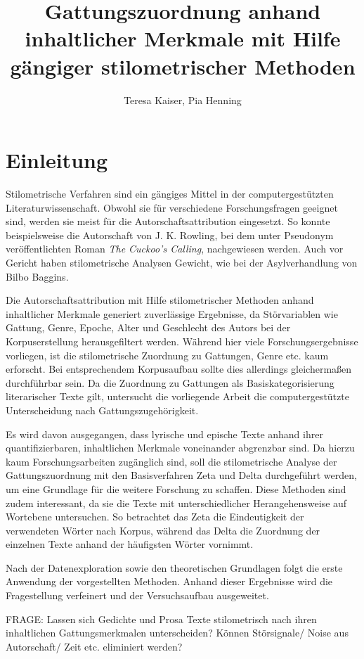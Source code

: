 \documentclass[a4paper,10p]{article}
\title{Gattungszuordnung anhand inhaltlicher Merkmale mit Hilfe gängiger stilometrischer Methoden}
\author{Teresa Kaiser, Pia Henning}
\begin{document}
\maketitle
\tableofcontents
\newpage
\listoffigures
\newpage
\section{Einleitung}
Stilometrische Verfahren sind ein gängiges Mittel in der computergestützten Literaturwissenschaft. Obwohl sie für verschiedene Forschungsfragen geeignet sind, werden sie meist für die Autorschaftsattribution eingesetzt. So konnte beispielsweise die Autorschaft von J. K. Rowling, bei dem unter Pseudonym veröffentlichten Roman \emph{The Cuckoo's Calling}, nachgewiesen werden. Auch vor Gericht haben stilometrische Analysen Gewicht, wie bei der Asylverhandlung von \glqq Bilbo Baggins\grqq \citep{Juola2015}.

Die Autorschaftsattribution mit Hilfe stilometrischer Methoden anhand inhaltlicher Merkmale generiert zuverlässige Ergebnisse, da Störvariablen wie Gattung, Genre, Epoche, Alter und Geschlecht des Autors bei der Korpuserstellung herausgefiltert werden. Während hier viele Forschungsergebnisse vorliegen, ist die stilometrische Zuordnung zu Gattungen, Genre etc. kaum erforscht. Bei ent\-sprech\-en\-dem Korpusaufbau sollte dies allerdings gleichermaßen durchführbar sein. Da die Zuordnung zu Gattungen als Basiskategorisierung literarischer Texte gilt, untersucht die vorliegende Arbeit die computergestützte Unterscheidung nach Gattungszugehörigkeit. 

Es wird davon ausgegangen, dass lyrische und epische Texte anhand ihrer quantifizierbaren, inhaltlichen Merkmale voneinander abgrenzbar sind. Da hierzu kaum Forschungsarbeiten zugänglich sind, soll die stilometrische Analyse der Gattungszuordnung mit den Basisverfahren Zeta und Delta durchgeführt werden, um eine Grundlage für die weitere Forschung zu schaffen. Diese Methoden sind zudem interessant, da sie die Texte mit unterschiedlicher Herangehensweise auf Wortebene untersuchen. So betrachtet das Zeta die Eindeutigkeit der verwendeten Wörter nach Korpus, während das Delta die Zuordnung der einzelnen Texte anhand der häufigsten Wörter vornimmt. 

Nach der Datenexploration sowie den theoretischen Grundlagen folgt die erste Anwendung der vorgestellten Methoden. Anhand dieser Ergebnisse wird die Fragestellung verfeinert und der Versuchsaufbau ausgeweitet.

FRAGE:   Lassen sich Gedichte und Prosa Texte stilometrisch nach ihren inhaltlichen Gattungsmerkmalen unterscheiden? Können Störsignale/ Noise aus Autorschaft/ Zeit etc. eliminiert werden?
\end{document}
